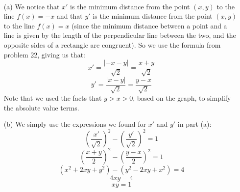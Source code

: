 \begin{problem}[4-23] \ 
\begin{enumerate}

\item[(a)]
We notice that $x'$ is the minimum distance from the point $(x, y)$ to the line $f(x) = -x$ and that $y'$ is the minimum distance from the point $(x, y)$ to the line $f(x) = x$ (since the minimum distance between a point and a line is given by the length of the perpendicular line between the two, and the opposite sides of a rectangle are congruent). So we use the formula from problem 22, giving us that:
\[ x' = \frac{|-x - y|}{\sqrt{2}} = \frac{x + y}{\sqrt{2}} \]
\[ y' = \frac{|x - y|}{\sqrt{2}} = \frac{y - x}{\sqrt{2}} \]
Note that we used the facts that $y > x > 0$, based on the graph, to simplify the absolute value terms.

\item[(b)]
We simply use the expressions we found for $x'$ and $y'$ in part (a):
\[ \left(\frac{x'}{\sqrt{2}}\right)^2 - \left(\frac{y'}{\sqrt{2}}\right)^2 = 1 \]
\[ \left(\frac{x + y}{2}\right)^2 - \left(\frac{y - x}{2}\right)^2 = 1 \]
\[ (x^2 + 2xy + y^2) - (y^2 - 2xy + x^2) = 4 \]
\[ 4xy = 4 \]
\[ xy = 1 \]

\end{enumerate}
\end{problem}

